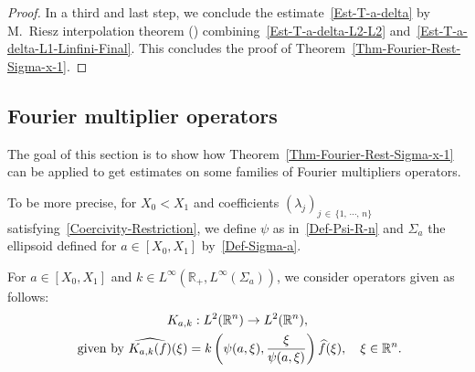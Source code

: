 \documentclass[AHL,Unicode,longabstracts]{cedram}
\newcommand*\R{\mathbb{R}}
\renewcommand{\hat}{\widehat}
\let\oldhat\hat
\renewcommand*{\hat}[1]{\mathchoice{\widehat{#1}}{\widehat{#1}}{\oldhat{#1}}{\oldhat{#1}}}
\begin{document}
\begin{proof}
In a third and last step, we conclude the estimate~\eqref{Est-T-a-delta} by M.~Riesz interpolation theorem (\cite[Theorem~0.1.13]{sogge2017fourier}) combining~\eqref{Est-T-a-delta-L2-L2} and~\eqref{Est-T-a-delta-L1-Linfini-Final}. This concludes the proof of Theorem~\ref{Thm-Fourier-Rest-Sigma-x-1}.
\end{proof}


\subsection{Fourier multiplier operators}\label{Subsec-Fourier-Multipliers}

The goal of this section is to show how Theorem~\ref{Thm-Fourier-Rest-Sigma-x-1} can be applied to get estimates on some families of Fourier multipliers operators.

To be more precise, for $X_0 <X_1$ and coefficients $(\lambda_j)_{j\, \in\,\{1,\, \cdots,\,n\}}$ satisfying~\eqref{Coercivity-Restriction}, we define $\psi$ as in~\eqref{Def-Psi-R-n} and $\Sigma_a$ the ellipsoid defined for $a \in [X_0,X_1]$ by~\eqref{Def-Sigma-a}.

For $a \in [X_0, X_1]$ and $k \in L^\infty(\R_+, L^\infty(\Sigma_a))$, we consider operators given as follows:
\begin{multline}\label{Class-Fourier-Multipliers}
K_{a,k} : L^2(\R^n) \to L^2(\R^n),\\
\text{ given by }
\widehat{K_{a,k}(f)} (\xi) = k\left(\psi(a,\xi),\frac{\xi}{\psi(a,\xi)} \right)
\hat f(\xi),
\quad \xi \in \R^n.
\end{multline}
\end{document}
